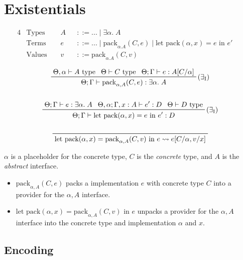 \documentclass[a4paper,11pt]{article}
\begin{document}
\section{Existentials}
{
    \begin{alignat*}{4}
    &\text{Types } &&A &&::= ... \mid \exists\alpha.\;A && \\
    &\text{Terms } &&e &&::= ... \mid \text{pack}_{\alpha.A}(C,e) \mid \text{let pack}(\alpha,x) = e\text{ in }e' && \\
    &\text{Values } &&v &&::= \text{pack}_{\alpha.A}(C,v) &&
    \end{alignat*}

    \begin{gather*}
    \prftree[r]{(\(\exists_\text{I}\))}
    {\Theta,\alpha\vdash A\text{ type}}
    {\Theta\vdash C\text{ type}}
    {\Theta;\Gamma\vdash e:A[C/\alpha]}
    {\Theta;\Gamma\vdash \text{pack}_{\alpha,A}(C,e) : \exists\alpha.\;A}
    \\
    \\
    \prftree[r]{(\(\exists_\text{I}\))}
    {\Theta;\Gamma\vdash e:\exists\alpha.\;A}
    {\Theta,\alpha;\Gamma,x:A \vdash e' : D}
    {\Theta\vdash D\text{ type}}
    {\Theta;\Gamma\vdash \text{let pack}(\alpha,x) = e\text{ in }e':D}
    \\
    \\
    \prftree[r]{}
    {\text{let pack}(\alpha,x) = \text{pack}_{\alpha,A}(C,v) \text{ in } e \leadsto e[C/\alpha,v/x]}
    \end{gather*}

    \(\alpha\) is a placeholder for the concrete type, \(C\) is the \textit{concrete} type, and \(A\) is the
    \textit{abstract} interface.

    \begin{itemize}
    \item
    {

        \(\text{pack}_{\alpha,A}(C,e)\) packs a implementation \(e\) with concrete type \(C\) into a provider for the
        \(\alpha,A\) interface.

    }
    \item
    {

        \(\text{let pack}(\alpha, x) = \text{pack}_{\alpha,A}(C,v)\text{ in }e\) unpacks a provider for the \(\alpha,A\)
        interface into the concrete type and implementation \(\alpha\) and \(x\).

    }
    \end{itemize}

    \subsection*{Encoding}
    {

}}
\end{document}
